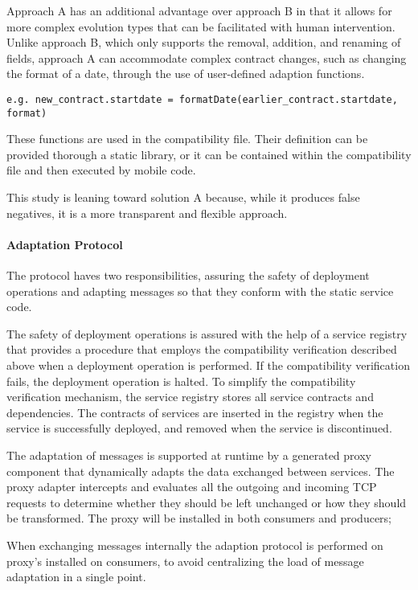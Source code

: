 Approach A has an additional advantage over approach B in that it allows for more complex evolution types that can be facilitated with human intervention.
Unlike approach B, which only supports the removal, addition,
and renaming of fields, approach A can accommodate complex contract changes,
such as changing the format of a date, through the use of user-defined adaption functions.

\texttt{e.g.\ new\_contract.startdate = formatDate(earlier\_contract.startdate, format)}

These functions are used in the compatibility file.
Their definition can be provided thorough a static library, or it can be contained within the compatibility file and then executed by mobile code.

This study is leaning toward solution A because, while it produces false negatives, it is a more transparent and flexible approach.

\paragraph{Adaptation Protocol}

The protocol haves two responsibilities, assuring the safety of deployment operations and adapting messages so that they conform with the static service code.

The safety of deployment operations is assured with the help of a service registry that provides a
procedure that employs the compatibility verification described above when a deployment operation is performed.
If the compatibility verification fails, the deployment operation is halted.
To simplify the compatibility verification mechanism, the service registry stores all service contracts and dependencies.
The contracts of services are inserted in the registry when the service is successfully deployed, and removed when the service is discontinued.

The adaptation of messages is supported at runtime by a generated proxy component that dynamically adapts the data exchanged between services.
The proxy adapter intercepts and evaluates all the outgoing and incoming TCP requests to determine whether
they should be left unchanged or how they should be transformed.
The proxy will be installed in both consumers and producers;

When exchanging messages internally the adaption protocol is performed on proxy's installed on consumers,
to avoid centralizing the load of message adaptation in a single point.

